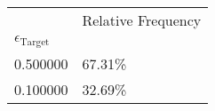 \begin{tabular}{ll}
 & Relative Frequency \\
$\epsilon_{{\text{{Target}}}}$ &  \\
0.500000 & 67.31\% \\
\cline{1-2}
0.100000 & 32.69\% \\
\cline{1-2}
\end{tabular}
